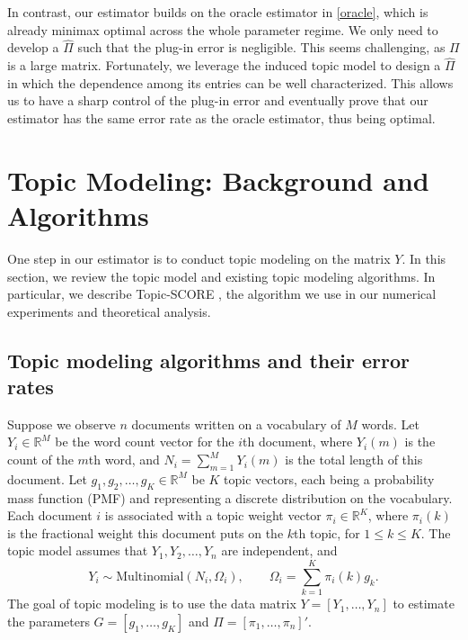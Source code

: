 \documentclass[preprint,11pt]{article}
\numberwithin{equation}{section}
\newcommand{\beq}{\begin{equation}}
\newcommand{\eeq}{\end{equation}}
\begin{document}
In contrast, our estimator builds on the oracle estimator in \eqref{oracle}, which is already minimax optimal across the whole parameter regime. We only need to develop a $\widehat{\Pi}$ such that the plug-in error is negligible. 
This seems challenging, as $\Pi$ is a large matrix. Fortunately, we leverage the induced topic model to design a $\widehat{\Pi}$ in which the dependence among its entries can be well characterized. This allows us to have a sharp control of the plug-in error and eventually prove that our estimator has the same error rate as the oracle estimator, thus being optimal. 


  

\section{Topic Modeling: Background and Algorithms} \label{sec:TM}
One step in our estimator is to conduct topic modeling on the matrix $Y$. In this section, we review the topic model and existing topic modeling algorithms. In particular, we describe Topic-SCORE \citep{ke2024using}, the algorithm we use in our numerical experiments and theoretical analysis. 



\subsection{Topic modeling algorithms and their error rates} \label{subsec:TM-review}
Suppose we observe $n$ documents written on a vocabulary of $M$ words. Let $Y_i\in\mathbb{R}^M$ be the word count vector for the $i$th document, where $Y_i(m)$ is the count of the $m$th word, and $N_i=\sum_{m=1}^M Y_i(m)$ is the total length of this document. Let $g_1, g_2,\ldots, g_K\in\mathbb{R}^M$ be $K$ topic vectors, each being a probability mass function (PMF) and representing a discrete distribution on the vocabulary. 
Each document $i$ is associated with a topic weight vector $\pi_i\in\mathbb{R}^K$, where $\pi_i(k)$ is the fractional weight this document puts on the $k$th topic, for $1\leq k\leq K$.  The topic model assumes that $Y_1, Y_2, \ldots, Y_n$ are independent, and 
\beq \label{topic-model}
Y_i\sim \mathrm{Multinomial}(N_i, \Omega_i), \qquad \Omega_i = \sum_{k=1}^K \pi_i(k)g_k. 
\eeq
The goal of topic modeling is to use the data matrix $Y=[Y_1, \ldots,Y_n]$ to estimate the parameters $G=[g_1, \ldots,g_K]$ and $\Pi=[\pi_1,\ldots, \pi_n]'$. 
\end{document}
